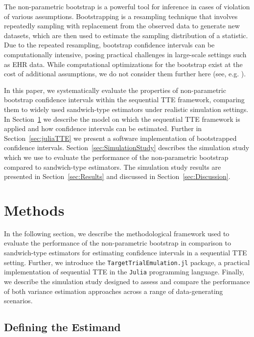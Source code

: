 \documentclass[pdflatex,sn-vancouver-ay]{sn-jnl}%
\theoremstyle{thmstyleone}%
\theoremstyle{thmstyletwo}%
\theoremstyle{thmstylethree}%
\newcommand{\julia}{\texttt{Julia}}
\newcommand{\juliaTTE}{\texttt{TargetTrialEmulation.jl}}
\begin{document}
The non-parametric bootstrap is a powerful tool for inference in cases of violation of various assumptions. Bootstrapping is a resampling technique that involves repeatedly sampling with replacement from the observed data to generate new datasets, which are then used to estimate the sampling distribution of a statistic. Due to the repeated resampling, bootstrap confidence intervals can be computationally intensive, posing practical challenges in large-scale settings such as EHR data. While computational optimizations for the bootstrap exist at the cost of additional assumptions, we do not consider them further here (see, e.g. \cite{liGeneralizedBootstrapProcedure2024, binderDesignBasedMethodsSurvey}).

In this paper, we systematically evaluate the properties of non-parametric bootstrap confidence intervals within the sequential TTE framework, comparing them to widely used sandwich-type estimators under realistic simulation settings. In Section~\ref{sec:Methods} we describe the model on which the sequential TTE framework is applied and how confidence intervals can be estimated. Further in Section~\ref{sec:juliaTTE} we present a software implementation of bootstrapped confidence intervals. Section~\ref{sec:SimulationStudy} describes the simulation study which we use to evaluate the performance of the non-parametric bootstrap compared to sandwich-type estimators. The simulation study results are presented in Section~\ref{sec:Results} and discussed in Section~\ref{sec:Discussion}.

\section{Methods}\label{sec:Methods}

In the following section, we describe the methodological framework used to evaluate the performance of the non-parametric bootstrap in comparison to sandwich-type estimators for estimating confidence intervals in a sequential TTE setting. Further, we introduce the \juliaTTE{} package, a practical implementation of sequential TTE in the \julia{} programming language. Finally, we describe the simulation study designed to assess and compare the performance of both variance estimation approaches across a range of data-generating scenarios.

\subsection{Defining the Estimand}\label{DefineEst}
\end{document}
